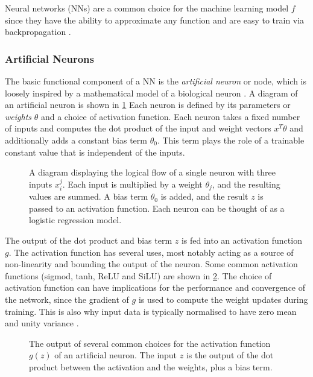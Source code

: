 Neural networks (NNs) are a common choice for the machine learning model $f$ since they have the ability to approximate any function \cite{HORNIK1989359} and are easy to train via backpropagation \cite{rumelhart1986learning}.

\subsubsection{Artificial Neurons}

The basic functional component of a NN is the \textit{artificial neuron} or node, which is loosely inspired by a mathematical model of a biological neuron \cite{mcculloch1943logical, hopfield1987neural}.
A diagram of an artificial neuron is shown in \cref{fig:neuron}
Each neuron is defined by its parameters or \textit{weights} $\theta$ and a choice of activation function.
Each neuron takes a fixed number of inputs and computes the dot product of the input and weight vectors $x^T \theta$ and additionally adds a constant bias term $\theta_0$.
This term plays the role of a trainable constant value that is independent of the inputs.

\begin{figure}[!htbp]
    \centering
    
    \caption{
      A diagram displaying the logical flow of a single neuron with three inputs $x_i^j$.
      Each input is multiplied by a weight $\theta_j$, and the resulting values are summed.
      A bias term $\theta_0$ is added, and the result $z$ is passed to an activation function.
      Each neuron can be thought of as a logistic regression model.
    }
    \label{fig:neuron}
\end{figure}

The output of the dot product and bias term $z$ is fed into an activation function $g$.
The activation function has several uses, most notably acting as a source of non-linearity and bounding the output of the neuron.
Some common activation functions (sigmod, tanh, ReLU and SiLU) are shown in \cref{fig:activation_functions}.
The choice of activation function can have implications for the performance and convergence of the network, since the gradient of $g$ is used to compute the weight updates during training.
This is also why input data is typically normalised to have zero mean and unity variance \cite{lecun2012efficient}.

\begin{figure}[!htbp]
  \centering
  
  \caption{
    The output of several common choices for the activation function $g(z)$ of an artificial neuron.
    The input $z$ is the output of the dot product between the activation and the weights, plus a bias term.
  }
  \label{fig:activation_functions}
\end{figure}


